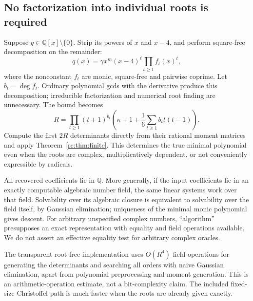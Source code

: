 \documentclass[11pt,a4paper]{article}
\numberwithin{equation}{section}
\theoremstyle{definition}
\theoremstyle{remark}
\newcommand{\QQ}{\mathbb Q}
\begin{document}
\subsection{No factorization into individual roots is required}
Suppose $q\in\QQ[x]\setminus\{0\}$.  Strip its powers of $x$ and $x-4$,
and perform square-free decomposition on the remainder:
\begin{equation}\label{rc:eq:squarefree}
 q(x)=\gamma x^m(x-4)^\ell\prod_{t\ge1} f_t(x)^t,
\end{equation}
where the nonconstant $f_t$ are monic, square-free and pairwise coprime.
Let $b_t=\deg f_t$.  Ordinary polynomial gcds with the derivative produce
this decomposition; irreducible factorization and numerical root finding
are unnecessary.  The bound becomes
\begin{equation}\label{rc:eq:rootfreebound}
 R=\prod_{t\ge1}(t+1)^{b_t}
       \left(\kappa+1+\frac16\sum_{t\ge1}b_t t(t-1)\right).
\end{equation}
Compute the first $2R$ determinants directly from their rational moment
matrices and apply Theorem~\ref{rc:thm:finite}.  This determines the true
minimal polynomial even when the roots are complex, multiplicatively
dependent, or not conveniently expressible by radicals.

All recovered coefficients lie in $\QQ$.  More generally, if the input
coefficients lie in an exactly computable algebraic number field, the
same linear systems work over that field.  Solvability over its algebraic
closure is equivalent to solvability over the field itself, by Gaussian
elimination; uniqueness of the minimal monic polynomial gives descent.
For arbitrary unspecified complex numbers, ``algorithm'' presupposes
an exact representation with equality and field operations available.
We do not assert an effective equality test for arbitrary complex oracles.

The transparent root-free implementation uses $O(R^4)$ field operations
for generating the determinants and searching all orders with naive
Gaussian elimination, apart from polynomial preprocessing and moment
generation.  This is an arithmetic-operation estimate, not a
bit-complexity claim.  The included fixed-size Christoffel path is much
faster when the roots are already given exactly.
\end{document}
